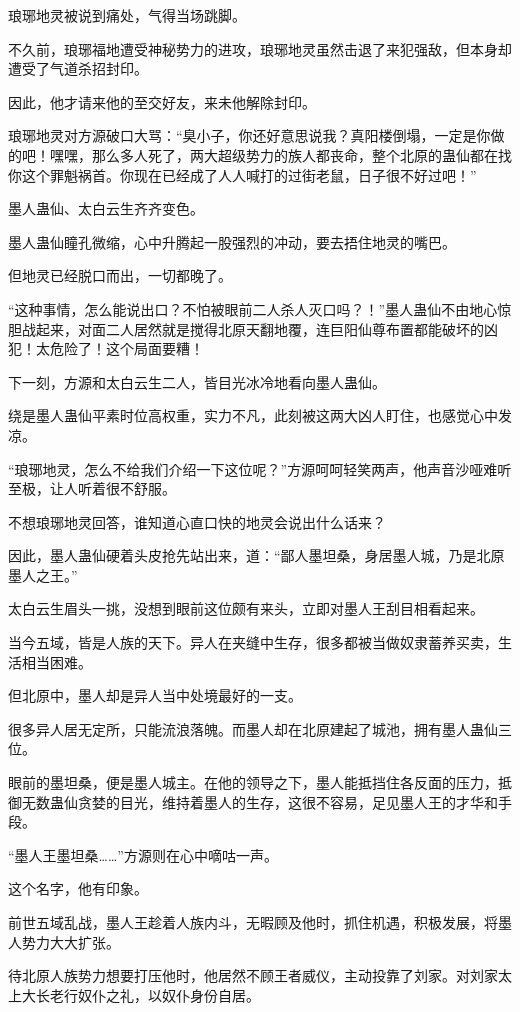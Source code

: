 \begin{this_body}
琅琊地灵被说到痛处，气得当场跳脚。

不久前，琅琊福地遭受神秘势力的进攻，琅琊地灵虽然击退了来犯强敌，但本身却遭受了气道杀招封印。

因此，他才请来他的至交好友，来未他解除封印。

琅琊地灵对方源破口大骂：“臭小子，你还好意思说我？真阳楼倒塌，一定是你做的吧！嘿嘿，那么多人死了，两大超级势力的族人都丧命，整个北原的蛊仙都在找你这个罪魁祸首。你现在已经成了人人喊打的过街老鼠，日子很不好过吧！”

墨人蛊仙、太白云生齐齐变色。

墨人蛊仙瞳孔微缩，心中升腾起一股强烈的冲动，要去捂住地灵的嘴巴。

但地灵已经脱口而出，一切都晚了。

“这种事情，怎么能说出口？不怕被眼前二人杀人灭口吗？！”墨人蛊仙不由地心惊胆战起来，对面二人居然就是搅得北原天翻地覆，连巨阳仙尊布置都能破坏的凶犯！太危险了！这个局面要糟！

下一刻，方源和太白云生二人，皆目光冰冷地看向墨人蛊仙。

绕是墨人蛊仙平素时位高权重，实力不凡，此刻被这两大凶人盯住，也感觉心中发凉。

“琅琊地灵，怎么不给我们介绍一下这位呢？”方源呵呵轻笑两声，他声音沙哑难听至极，让人听着很不舒服。

不想琅琊地灵回答，谁知道心直口快的地灵会说出什么话来？

因此，墨人蛊仙硬着头皮抢先站出来，道：“鄙人墨坦桑，身居墨人城，乃是北原墨人之王。”

太白云生眉头一挑，没想到眼前这位颇有来头，立即对墨人王刮目相看起来。

当今五域，皆是人族的天下。异人在夹缝中生存，很多都被当做奴隶蓄养买卖，生活相当困难。

但北原中，墨人却是异人当中处境最好的一支。

很多异人居无定所，只能流浪落魄。而墨人却在北原建起了城池，拥有墨人蛊仙三位。

眼前的墨坦桑，便是墨人城主。在他的领导之下，墨人能抵挡住各反面的压力，抵御无数蛊仙贪婪的目光，维持着墨人的生存，这很不容易，足见墨人王的才华和手段。

“墨人王墨坦桑……”方源则在心中嘀咕一声。

这个名字，他有印象。

前世五域乱战，墨人王趁着人族内斗，无暇顾及他时，抓住机遇，积极发展，将墨人势力大大扩张。

待北原人族势力想要打压他时，他居然不顾王者威仪，主动投靠了刘家。对刘家太上大长老行奴仆之礼，以奴仆身份自居。


\end{this_body}
